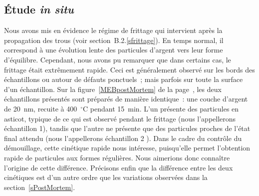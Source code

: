 \subsection{Étude \textit{in situ}}
Nous avons mis en évidence le régime de frittage qui intervient après la propagation des trous (voir section~B.2.\ref{sfrittage}). En temps normal, il correspond à une évolution lente des particules d'argent vers leur forme d'équilibre. Cependant, nous avons pu remarquer que dans certains cas, le frittage était extrêmement rapide. Ceci est généralement observé sur les bords des échantillons ou autour de défauts ponctuels~; mais parfois sur toute la surface d'un échantillon. Sur la figure~\ref{MEBpostMortem} de la page~\pageref{MEBpostMortem}, les deux échantillons présentés sont préparés de manière identique~: une couche d'argent de 20~nm, recuite à 400~$^\circ$C pendant 15~min. L'un présente des particules en asticot, typique de ce qui est observé pendant le frittage (nous l'appellerons \og échantillon 1\fg), tandis que l'autre ne présente que des particules proches de l'état final attendu (nous l'appellerons \og échantillon 2 \fg). Dans le cadre du contrôle du démouillage, cette cinétique rapide nous intéresse, puisqu'elle permet l'obtention rapide de particules aux formes régulières. Nous aimerions donc connaître l'origine de cette différence. Précisons enfin que la différence entre les deux cinétiques est d'un autre ordre que les variations observées dans la section~\ref{sPostMortem}.\\[12pt]

